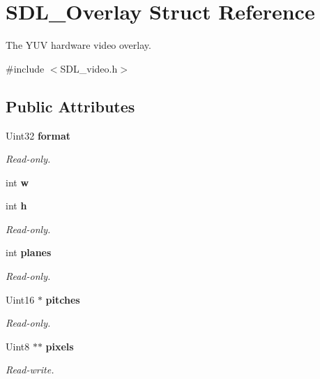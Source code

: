 \section{S\+D\+L\+\_\+\+Overlay Struct Reference}
\label{struct_s_d_l___overlay}


The Y\+U\+V hardware video overlay.  




{\ttfamily \#include $<$S\+D\+L\+\_\+video.\+h$>$}

\subsection*{Public Attributes}
\begin{DoxyCompactItemize}
\item 
Uint32 {\bf format}\label{struct_s_d_l___overlay_a421f873d1ffc5530c1f9d4b49be75d4e}

\begin{DoxyCompactList}\small\item\em Read-\/only. \end{DoxyCompactList}\item 
int {\bfseries w}\label{struct_s_d_l___overlay_a8a73fe76717c183d52dd67a6981fd84d}

\item 
int {\bf h}\label{struct_s_d_l___overlay_af1402a7a7cd8ba2816ddc7542c9d3e67}

\begin{DoxyCompactList}\small\item\em Read-\/only. \end{DoxyCompactList}\item 
int {\bf planes}\label{struct_s_d_l___overlay_ab91d676ef6310197aa189c469be3d50a}

\begin{DoxyCompactList}\small\item\em Read-\/only. \end{DoxyCompactList}\item 
Uint16 $\ast$ {\bf pitches}\label{struct_s_d_l___overlay_ad88bb773013ff535c647af38760c69e8}

\begin{DoxyCompactList}\small\item\em Read-\/only. \end{DoxyCompactList}\item 
Uint8 $\ast$$\ast$ {\bf pixels}\label{struct_s_d_l___overlay_a782b8904e618e8a1c2c8299c3994ec8f}

\begin{DoxyCompactList}\small\item\em Read-\/write. \end{DoxyCompactList}\end{DoxyCompactItemize}
